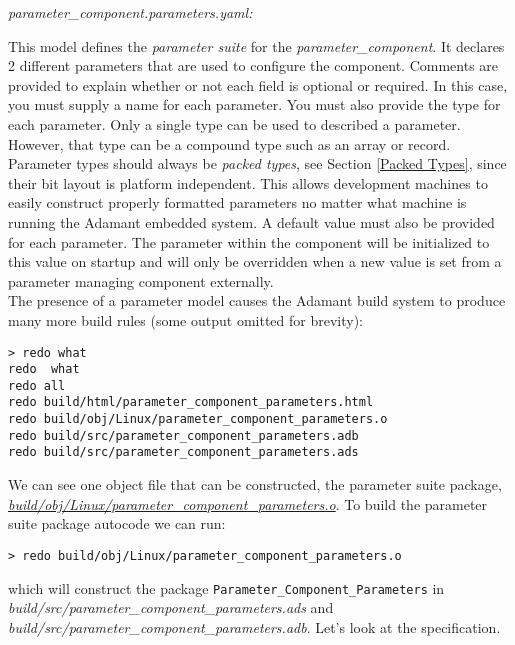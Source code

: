 \textit{parameter\_component.parameters.yaml:}

This model defines the \textit{parameter suite} for the \textit{parameter\_component}. It declares 2 different parameters that are used to configure the component. Comments are provided to explain whether or not each field is optional or required. In this case, you must supply a name for each parameter. You must also provide the type for each parameter. Only a single type can be used to described a parameter. However, that type can be a compound type such as an array or record. Parameter types should always be \textit{packed types}, see Section \ref{Packed Types}, since their bit layout is platform independent. This allows development machines to easily construct properly formatted parameters no matter what machine is running the Adamant embedded system. A default value must also be provided for each parameter. The parameter within the component will be initialized to this value on startup and will only be overridden when a new value is set from a parameter managing component externally. \\

The presence of a parameter model causes the Adamant build system to produce many more build rules (some output omitted for brevity):

\vspace{5mm} %
\begin{verbatim}
> redo what 
redo  what
redo all
redo build/html/parameter_component_parameters.html
redo build/obj/Linux/parameter_component_parameters.o
redo build/src/parameter_component_parameters.adb
redo build/src/parameter_component_parameters.ads
\end{verbatim}
\vspace{5mm} %

We can see one object file that can be constructed, the parameter suite package, \textit{\url{build/obj/Linux/parameter\_component\_parameters.o}}. To build the parameter suite package autocode we can run:

\vspace{5mm} %
\begin{verbatim}
> redo build/obj/Linux/parameter_component_parameters.o
\end{verbatim}
\vspace{5mm} %

which will construct the package \texttt{Parameter\_Component\_Parameters} in \textit{build/src/parameter\_component\_parameters.ads} and \textit{build/src/parameter\_component\_parameters.adb}. Let's look at the specification. \\

